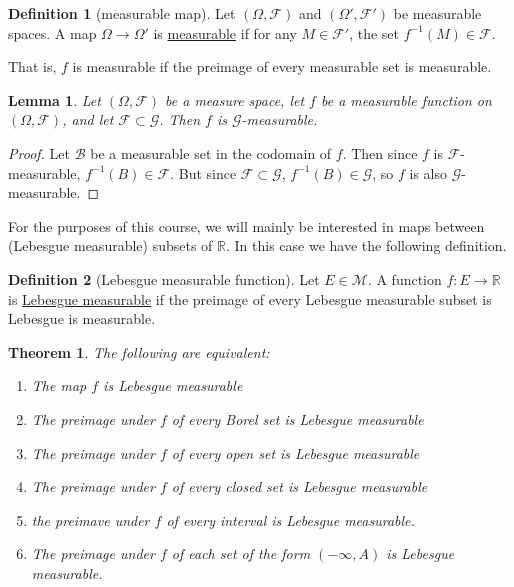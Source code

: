\documentclass[a4paper,12pt]{scrreprt}
\newcommand{\R}{\mathbb{R}}
\newcommand{\defn}[1]{\ul{#1}}
\theoremstyle{definition}
\newtheorem{definition}{Definition}[section]
\theoremstyle{plain}
\newtheorem{theorem}{Theorem}[section]
\newtheorem{lemma}{Lemma}[section]
\theoremstyle{remark}
\begin{document}
\begin{definition}[measurable map]
  \label{def:measurablefunction}
  Let $(\Omega, \mathcal{F})$ and $(\Omega', \mathcal{F}')$ be measurable spaces. A map $\Omega \to \Omega'$ is \defn{measurable} if for any $M \in \mathcal{F}'$, the set $f^{-1}(M) \in \mathcal{F}$.

  That is, $f$ is measurable if the preimage of every measurable set is measurable.
\end{definition}

\begin{lemma}
  \label{lemma:functionalsomeasurablewithrespecttobiggersigmaalgebra}
  Let $(\Omega, \mathcal{F})$ be a measure space, let $f$ be a measurable function on $(\Omega, \mathcal{F})$, and let $\mathcal{F} \subset \mathcal{G}$. Then $f$ is $\mathcal{G}$-measurable.
\end{lemma}
\begin{proof}
  Let $\mathcal{B}$ be a measurable set in the codomain of $f$. Then since $f$ is $\mathcal{F}$-measurable, $f^{-1}(B) \in \mathcal{F}$. But since $\mathcal{F} \subset \mathcal{G}$, $f^{-1}(B) \in \mathcal{G}$, so $f$ is also $\mathcal{G}$-measurable.
\end{proof}

For the purposes of this course, we will mainly be interested in maps between (Lebesgue measurable) subsets of $\R$. In this case we have the following definition.
\begin{definition}[Lebesgue measurable function]
  \label{def:lebesguemeasurablefunction}
  Let $E \in \mathcal{M}$. A function $f\colon E \to \R$ is \defn{Lebesgue measurable} if the preimage of every Lebesgue measurable subset is Lebesgue is measurable.
\end{definition}

\begin{theorem}
  The following are equivalent:
  \begin{enumerate}
    \item The map $f$ is Lebesgue measurable

    \item The preimage under $f$ of every Borel set is Lebesgue measurable

    \item The preimage under $f$ of every open set is Lebesgue measurable

    \item The preimage under $f$ of every closed set is Lebesgue measurable

    \item the preimave under $f$ of every interval is Lebesgue measurable.

    \item The preimage under $f$ of each set of the form $(-\infty, A)$ is Lebesgue measurable.
  \end{enumerate}
\end{theorem}
\end{document}
